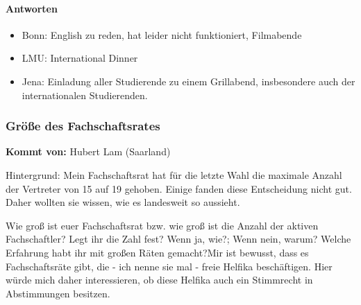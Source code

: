       \paragraph{Antworten}
        \begin{itemize}
          \item Bonn: English zu reden, hat leider nicht funktioniert, Filmabende
          \item LMU: International Dinner
          \item Jena: Einladung aller Studierende zu einem Grillabend, insbesondere auch der internationalen Studierenden.
        \end{itemize}

    \subsubsection*{Größe des Fachschaftsrates}
      \textbf{Kommt von:} Hubert Lam (Saarland)

      Hintergrund: Mein Fachschaftsrat hat für die letzte Wahl die maximale Anzahl der Vertreter von 15 auf 19 gehoben. Einige fanden diese Entscheidung nicht gut. Daher wollten sie wissen, wie es landesweit so aussieht. \\

      \begin{itemize}
Wie groß ist euer Fachschaftsrat bzw. wie groß ist die Anzahl der aktiven Fachschaftler?
Legt ihr die Zahl fest? Wenn ja, wie?; Wenn nein, warum?
Welche Erfahrung habt ihr mit großen Räten gemacht?Mir ist bewusst, dass es Fachschaftsräte gibt, die - ich nenne sie mal - freie Helfika beschäftigen. Hier würde mich daher interessieren, ob diese Helfika auch ein Stimmrecht in Abstimmungen besitzen.
      \end{itemize}

